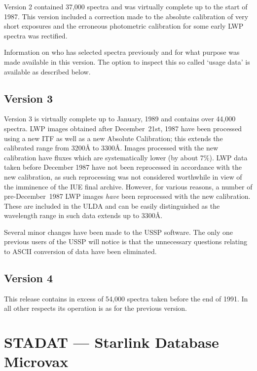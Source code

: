 Version 2  contained 37,000 spectra and was virtually complete 
up to the start of 1987. 
This version included a correction made to the absolute calibration 
of very short exposures 
and the erroneous photometric calibration for some early 
LWP spectra was rectified.

Information on who has selected spectra previously and for what purpose was
made available in this version.
The option to inspect this so called `usage data'  is available
as described below.

\subsection{Version 3}

Version 3 is virtually complete up to January,  1989 and contains 
over  44,000 spectra.
LWP images obtained after December~21st, 1987 have been processed using
a new  ITF  as  well  as  a  new  Absolute  Calibration;
this  extends  the  calibrated  range  from 3200{\AA}
to  3300{\AA}.
Images processed with the  new  calibration have fluxes which are  
systematically lower (by about 7\%).
LWP data taken before December 1987 have not been reprocessed in 
accordance with the new calibration, as 
such reprocessing was not considered worthwhile in view 
of the imminence of the IUE final archive.
However, for various reasons, a number of pre-December~1987 LWP images 
{\sl have\/} been reprocessed with the new calibration.
These are included in the ULDA and can be easily distinguished as the 
wavelength range  in such data extends up to 3300{\AA}.

Several minor changes have been made to the USSP software.
The only one previous 
users of the USSP will notice is that the unnecessary questions relating to 
ASCII conversion of data have been eliminated. 

\subsection{Version 4}

This release contains in excess of 54,000 spectra taken before the
end of 1991. In all other respects its operation is as for the previous
version.



\section{STADAT --- Starlink Database Microvax}

